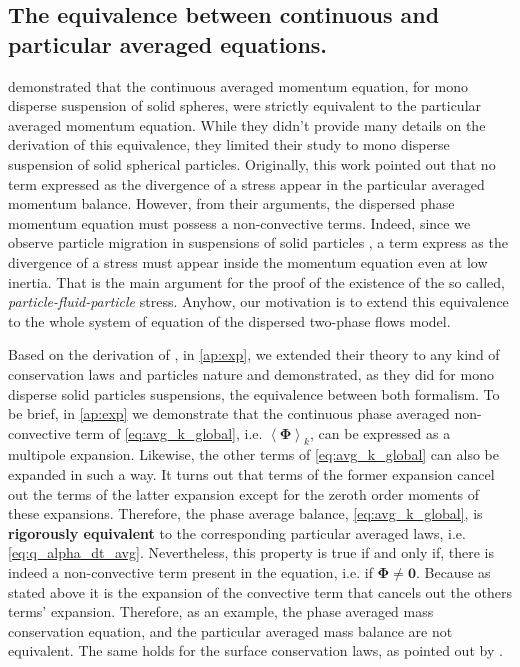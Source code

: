 \documentclass[twocolumn]{My_article}
\newcommand{\kavg}[1]{\left<#1\right>_k}
\begin{document}
\subsection{The equivalence between continuous and particular averaged equations.}

\citet{nott2011suspension} demonstrated that the continuous averaged momentum equation, for mono disperse suspension of solid spheres, were strictly equivalent to the particular averaged momentum equation.
While they didn't provide many details on the derivation of this equivalence, they limited their study to mono disperse suspension of solid spherical particles.
Originally, this work pointed out that no term expressed as the divergence of a stress appear in the particular averaged momentum balance.
However, from their arguments, the dispersed phase momentum equation must possess a non-convective terms.
Indeed, since we observe particle migration in suspensions of solid particles \citep{guazzelli2011}, a term express as the divergence of a stress must appear inside the momentum equation even at low inertia.
That is the main argument for the proof of the existence of the so called, \textit{particle-fluid-particle} stress.
Anyhow, our motivation is to extend this equivalence to the whole system of equation of the dispersed two-phase flows model.

Based on the derivation of \citet{nott2011suspension}, in \ref{ap:exp}, we extended their theory to any kind of conservation laws and particles nature and demonstrated, as they did for mono disperse solid particles suspensions, the equivalence between both formalism.
To be brief, in \ref{ap:exp} we demonstrate that the continuous phase averaged non-convective term of \ref{eq:avg_k_global}, i.e.  $\kavg{\bm{\Phi}}$, can  be expressed as a multipole expansion.
Likewise, the other terms of \ref{eq:avg_k_global} can also be expanded in such a way.
It turns out that terms of the former expansion cancel out the terms of the latter expansion except for the zeroth order moments of these expansions.
Therefore, the phase average balance, \ref{eq:avg_k_global}, is \textbf{rigorously equivalent} to the corresponding particular averaged laws, i.e. \ref{eq:q_alpha_dt_avg}.
Nevertheless, this property is true if and only if, there is indeed a non-convective term present in the equation, i.e. if $\bm{\Phi} \neq \textbf{0}$. Because as stated above it is the expansion of the convective term that cancels out the others terms' expansion.
Therefore, as an example, the phase averaged mass conservation equation, and the particular averaged mass balance are not equivalent.
The same holds for the surface conservation laws, as pointed out by \citet{lhuillier2000bilan}.
\end{document}
